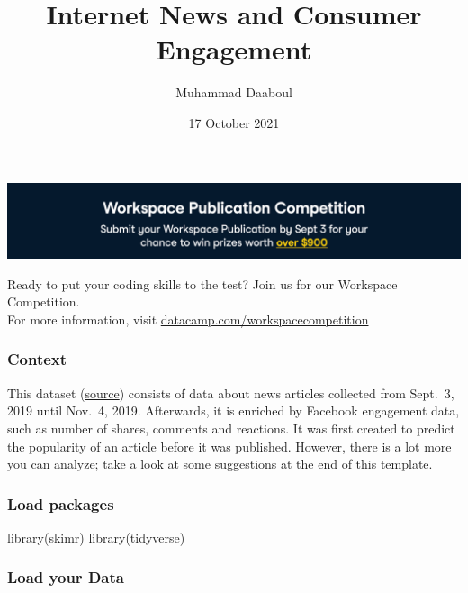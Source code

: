 \documentclass[
]{article}
\title{Internet News and Consumer Engagement}
\author{Muhammad Daaboul}
\date{17 October 2021}
\newenvironment{Shaded}{\begin{snugshade}}{\end{snugshade}}
\newcommand{\FunctionTok}[1]{\textcolor[rgb]{0.00,0.00,0.00}{#1}}
\newcommand{\NormalTok}[1]{#1}
\begin{document}
\maketitle

\includegraphics{banner.png}

Ready to put your coding skills to the test? Join us for our Workspace
Competition.\\
For more information, visit
\href{https://datacamp.com/workspacecompetition}{datacamp.com/workspacecompetition}

\hypertarget{context}{%
\subsubsection{Context}\label{context}}

This dataset
(\href{https://www.kaggle.com/szymonjanowski/internet-articles-data-with-users-engagement}{source})
consists of data about news articles collected from Sept.~3, 2019 until
Nov.~4, 2019. Afterwards, it is enriched by Facebook engagement data,
such as number of shares, comments and reactions. It was first created
to predict the popularity of an article before it was published.
However, there is a lot more you can analyze; take a look at some
suggestions at the end of this template.

\hypertarget{load-packages}{%
\subsubsection{Load packages}\label{load-packages}}

\begin{Shaded}
\begin{Highlighting}[]
\FunctionTok{library}\NormalTok{(skimr)}
\FunctionTok{library}\NormalTok{(tidyverse)}
\end{Highlighting}
\end{Shaded}

\hypertarget{load-your-data}{%
\subsubsection{Load your Data}\label{load-your-data}}
\end{document}
